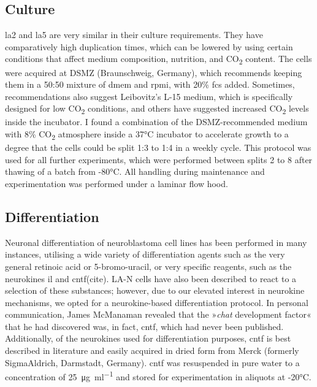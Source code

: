 \begin{method}

\subsection{Culture}

\ac{la2} and \ac{la5} are very similar in their culture requirements. They have comparatively high duplication times, which can be lowered by using certain conditions that affect medium composition, nutrition, and CO\textsubscript{2} content. The cells were acquired at DSMZ (Braunschweig, Germany), which recommends keeping them in a 50:50 mixture of \ac{dmem} and \ac{rpmi}, with 20\% \ac{fcs} added. Sometimes, recommendations also suggest Leibovitz's L-15 medium, which is specifically designed for low CO\textsubscript{2} conditions, and others have suggested increased CO\textsubscript{2} levels inside the incubator. I found a combination of the DSMZ-recommended medium with 8\% CO\textsubscript{2} atmosphere inside a 37°C incubator to accelerate growth to a degree that the cells could be split 1:3 to 1:4 in a weekly cycle. This protocol was used for all further experiments, which were performed between splits 2 to 8 after thawing of a batch from -80°C. All handling during maintenance and experimentation was performed under a laminar flow hood.

\subsection{Differentiation}

Neuronal differentiation of neuroblastoma cell lines has been performed in many instances, utilising a wide variety of differentiation agents such as the very general retinoic acid or 5-bromo-uracil, or very specific reagents, such as the neurokines \ac{il} and \ac{cntf}(cite). LA-N cells have also been described to react to a selection of these substances; however, due to our elevated interest in neurokine mechanisms, we opted for a neurokine-based differentiation protocol. In personal communication, James McManaman revealed that the »\textit{\ac{chat}} development factor« that he had discovered\cite{McManaman1988} was, in fact, \ac{cntf}, which had never been published. Additionally, of the neurokines used for differentiation purposes, \ac{cntf} is best described in literature and easily acquired in dried form from Merck (formerly SigmaAldrich, Darmstadt, Germany). \ac{cntf} was resuspended in pure water to a concentration of \SI{25}{\micro\gram\per\milli\litre} and stored for experimentation in aliquots at -20°C.


\end{method}
